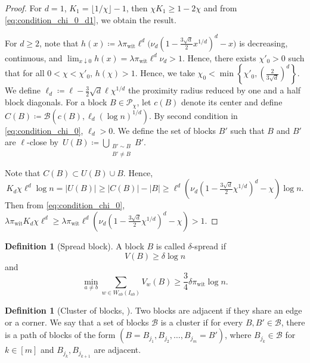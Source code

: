 \documentclass[11pt, a4paper]{amsart}
\newcommand{\1}{\mathbf{1}}
\theoremstyle{definition}
\newtheorem{definition}[theorem]{Definition}
\theoremstyle{remark}
\theoremstyle{definition}
\begin{document}
\begin{proof}
    For $d=1$, $K_1 = \lfloor 1/\chi \rfloor-1$, then $\chi K_1 \geq 1 - 2\chi$ and from \eqref{eq:condition_chi_0_d1}, we obtain the result.
    
   For $d\geq 2$, note that $h(x) \coloneqq \lambda \pi_\mathrm{wit} \ell^d \Big( \nu_d \left(
    1-\tfrac{3\sqrt d}{2}x^{1/d}
    \right)^d- x \Big)$ is decreasing, continuous, and $\lim_{x\downarrow 0}h(x) = \lambda \pi_\mathrm{wit} \ell^d \nu_d > 1$. Hence, there exists $\chi'_0>0$ such that for all $0 < \chi < \chi'_0$, $h(\chi) > 1$. Hence, we take $\chi_0 < \min\left\{\chi'_0, \left(\frac{2}{3\sqrt d}\right)^d\right\}$. We define $\ell_d \coloneqq \ell - \tfrac{3}{2}\sqrt{d} \ell \chi^{1/d}$ the proximity radius reduced by one and a half block diagonals.
   For a block
$B\in\mathcal P_\chi$, let $c(B)$ denote its center and define $C(B) \coloneqq \mathcal B\left(
        c(B),
        \ell_d(\log n)^{1/d}
    \right)$. By second condition in  \eqref{eq:condition_chi_0}, $\ell_d > 0$.  We define the set of blocks $B'$ such that $B$ and $B'$ are $\ell$-close by~$U(B) \coloneqq
    \bigcup_{\substack{B'\sim B \\ B'\neq B}} B'$.
    
Note that $C(B) \subset U(B) \cup B$. Hence,
\[
    K_d \chi \ell^d\log n =
    |U(B)| \geq |C(B)| - |B| \geq \ell^d \left(\nu_d \left(1-\tfrac{3\sqrt d}{2}\chi^{1/d}\right)^d- \chi\right)\log n
.\]
Then from \eqref{eq:condition_chi_0},
$\lambda \pi_\mathrm{wit}K_d \chi \ell^d \geq \lambda \pi_\mathrm{wit} \ell^d \left( \nu_d ( 1-\tfrac{3\sqrt d}{2}\chi^{1/d} )^d -\chi\right)>1$.
\end{proof}

\begin{definition}[Spread block]
\label{def: spread block}
A block $B$ is called $\delta$-spread if
\[
V(B)\geq\delta\log n
\]
and
\[
\min_{a\neq b}
\sum_{w\in W_{ab}(I_{ab})}V_w(B)
\geq
\frac34\delta\pi_{\mathrm{wit}}\log n.
\]
\end{definition}



\begin{definition}[Cluster of blocks, {\cite[Definition C.2]{gaudio2025incguan}}]
    Two blocks are adjacent if they share an edge or a corner. We say that a set of blocks $\mathcal B$ is a cluster if for every $B, B' \in \mathcal B$, there is a path of blocks of the form $(B = B_{j_1}, B_{j_2}, \dots, B_{j_m} = B')$, where $B_{j_k} \in \mathcal B$ for $k \in [m]$ and $B_{j_k}, B_{j_{k+1}}$ are adjacent.
\end{definition}
\end{document}
